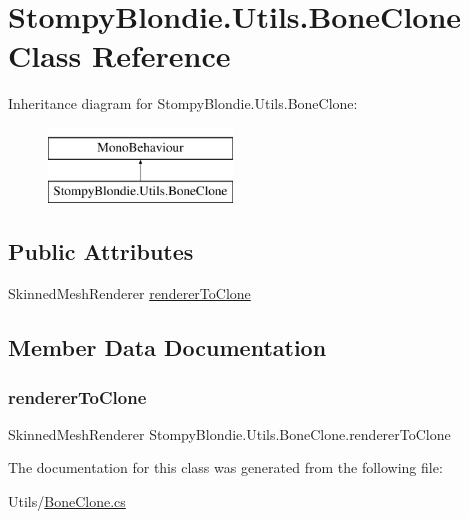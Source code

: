 \hypertarget{class_stompy_blondie_1_1_utils_1_1_bone_clone}{}\section{Stompy\+Blondie.\+Utils.\+Bone\+Clone Class Reference}
\label{class_stompy_blondie_1_1_utils_1_1_bone_clone}
Inheritance diagram for Stompy\+Blondie.\+Utils.\+Bone\+Clone\+:\begin{figure}[H]
\begin{center}
\leavevmode
\includegraphics[height=2.000000cm]{class_stompy_blondie_1_1_utils_1_1_bone_clone}
\end{center}
\end{figure}
\subsection*{Public Attributes}
\begin{DoxyCompactItemize}
\item 
Skinned\+Mesh\+Renderer \mbox{\hyperlink{class_stompy_blondie_1_1_utils_1_1_bone_clone_a2003810e13282194ef8aae44d587a9ab}{renderer\+To\+Clone}}
\end{DoxyCompactItemize}


\subsection{Member Data Documentation}
\mbox{\label{class_stompy_blondie_1_1_utils_1_1_bone_clone_a2003810e13282194ef8aae44d587a9ab}} 
\subsubsection{\texorpdfstring{renderer\+To\+Clone}{rendererToClone}}
{\footnotesize\ttfamily Skinned\+Mesh\+Renderer Stompy\+Blondie.\+Utils.\+Bone\+Clone.\+renderer\+To\+Clone}



The documentation for this class was generated from the following file\+:\begin{DoxyCompactItemize}
\item 
Utils/\mbox{\hyperlink{_bone_clone_8cs}{Bone\+Clone.\+cs}}\end{DoxyCompactItemize}
